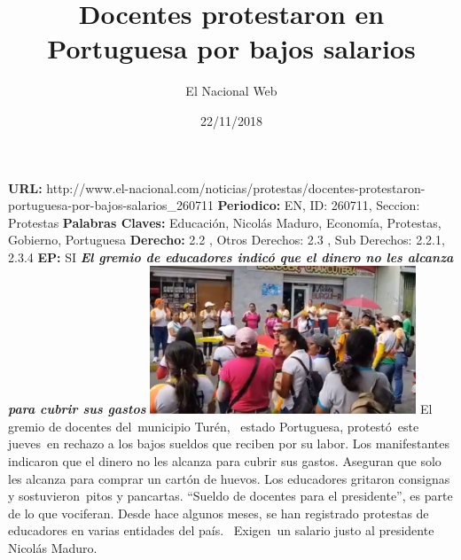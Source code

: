 \documentclass{article}%
\title{\textbf{Docentes protestaron en Portuguesa por bajos salarios}}%
\author{El Nacional Web}%
\date{22/11/2018}%
\begin{document}
%
\normalsize%
\maketitle%
\textbf{URL: }%
http://www.el{-}nacional.com/noticias/protestas/docentes{-}protestaron{-}portuguesa{-}por{-}bajos{-}salarios\_260711\newline%
%
\textbf{Periodico: }%
EN, %
ID: %
260711, %
Seccion: %
Protestas\newline%
%
\textbf{Palabras Claves: }%
Educación, Nicolás Maduro, Economía, Protestas, Gobierno, Portuguesa\newline%
%
\textbf{Derecho: }%
2.2%
, Otros Derechos: %
2.3%
, Sub Derechos: %
2.2.1, 2.3.4%
\newline%
%
\textbf{EP: }%
SI\newline%
\newline%
%
\textbf{\textit{El gremio de educadores indicó que el dinero no les alcanza para cubrir sus gastos}}%
\newline%
\newline%
%
\includegraphics[width=300px]{263.jpg}%
\newline%
%
El gremio de docentes del~municipio Turén, ~estado Portuguesa, protestó~este jueves~en rechazo a los bajos sueldos que reciben por su labor.%
\newline%
%
Los manifestantes indicaron que el dinero no les alcanza para cubrir sus gastos. Aseguran que solo les alcanza para comprar un cartón de huevos.%
\newline%
%
Los educadores gritaron consignas y sostuvieron~pitos y pancartas. “Sueldo de docentes para el presidente”, es parte de lo que vociferan.%
\newline%
%
Desde hace algunos meses, se han registrado protestas de educadores en varias entidades del país.~ Exigen~un salario justo al presidente Nicolás Maduro.%
\newline%
%
\end{document}
